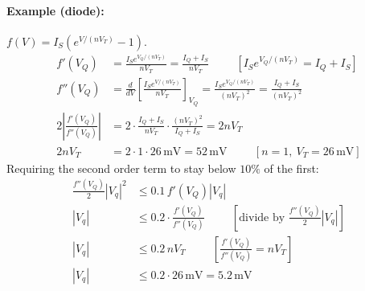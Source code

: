 \paragraph{Example (diode):} \(f(V) = I_S\left(e^{V/(nV_T)} - 1\right)\).
\begin{align*}
  f'(V_Q) &= \frac{I_S e^{V_Q/(nV_T)}}{nV_T} = \frac{I_Q + I_S}{nV_T} \hspace{1cm} [I_S e^{V_Q/(nV_T)} = I_Q + I_S] \\
  f''(V_Q) &= \frac{d}{dV}\left[\frac{I_S e^{V/(nV_T)}}{nV_T}\right]_{V_Q} = \frac{I_S e^{V_Q/(nV_T)}}{(nV_T)^2} = \frac{I_Q + I_S}{(nV_T)^2} \\
  2\left|\frac{f'(V_Q)}{f''(V_Q)}\right| &= 2 \cdot \frac{I_Q + I_S}{nV_T} \cdot \frac{(nV_T)^2}{I_Q + I_S} = 2 n V_T \\
  2 n V_T &= 2 \cdot 1 \cdot 26\,\text{mV} = 52\,\text{mV} \hspace{1cm} [n = 1,\ V_T = 26\,\text{mV}]
\end{align*}
Requiring the second order term to stay below \(10\%\) of the first:
\begin{align*}
  \frac{f''(V_Q)}{2} |V_q|^2 &\leq 0.1\, f'(V_Q) |V_q| \\
  |V_q| &\leq 0.2 \cdot \frac{f'(V_Q)}{f''(V_Q)} \hspace{1cm} [\text{divide by } \tfrac{f''(V_Q)}{2} |V_q|] \\
  |V_q| &\leq 0.2\, n V_T \hspace{1cm} \left[\frac{f'(V_Q)}{f''(V_Q)} = nV_T\right] \\
  |V_q| &\leq 0.2 \cdot 26\,\text{mV} = 5.2\,\text{mV}
\end{align*}

